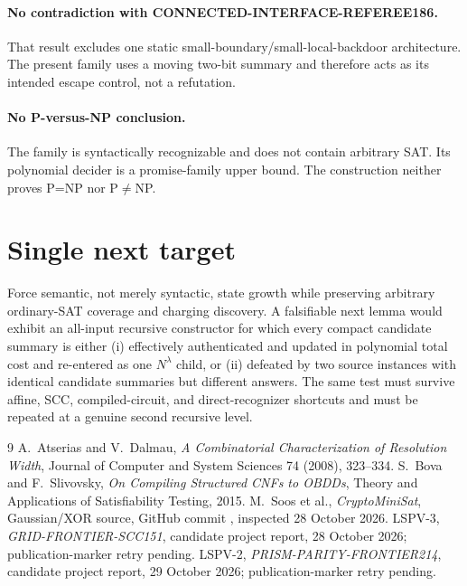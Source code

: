 \documentclass[11pt]{article}
\begin{document}
\paragraph{No contradiction with CONNECTED-INTERFACE-REFEREE186.}
That result excludes one static small-boundary/small-local-backdoor
architecture.  The present family uses a moving two-bit summary and therefore
acts as its intended escape control, not a refutation.
\paragraph{No P-versus-NP conclusion.}
The family is syntactically recognizable and does not contain arbitrary SAT.
Its polynomial decider is a promise-family upper bound.  The construction
neither proves P=NP nor P$\ne$NP.

\section{Single next target}
Force semantic, not merely syntactic, state growth while preserving arbitrary
ordinary-SAT coverage and charging discovery.  A falsifiable next lemma would
exhibit an all-input recursive constructor for which every compact candidate
summary is either (i) effectively authenticated and updated in polynomial
total cost and re-entered as one $N^\lambda$ child, or (ii) defeated by two
source instances with identical candidate summaries but different answers.
The same test must survive affine, SCC, compiled-circuit, and direct-recognizer
shortcuts and must be repeated at a genuine second recursive level.

\begin{thebibliography}{9}
 A.~Atserias and V.~Dalmau,
\emph{A Combinatorial Characterization of Resolution Width},
Journal of Computer and System Sciences 74 (2008), 323--334.
 S.~Bova and F.~Slivovsky,
\emph{On Compiling Structured CNFs to OBDDs},
Theory and Applications of Satisfiability Testing, 2015.
 M.~Soos et al., \emph{CryptoMiniSat}, Gaussian/XOR source,
GitHub commit , inspected 28 October 2026.
 LSPV-3, \emph{GRID-FRONTIER-SCC151}, candidate project
report, 28 October 2026; publication-marker retry pending.
 LSPV-2, \emph{PRISM-PARITY-FRONTIER214}, candidate
project report, 29 October 2026; publication-marker retry pending.
\end{thebibliography}

\end{document}
